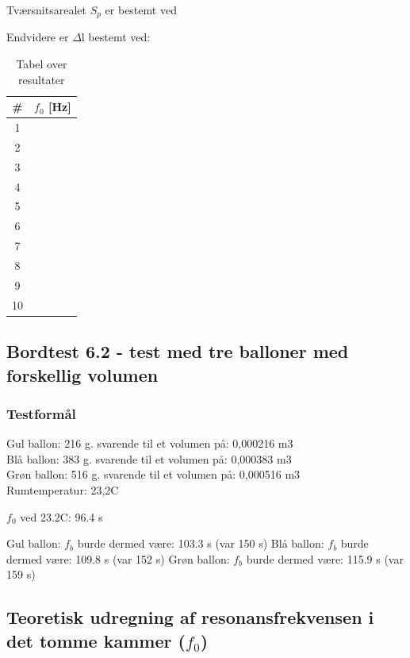 {		Tværsnitsarealet $S_{p}$ er bestemt ved
		\Sp
		
		Endvidere er $\Delta$l bestemt ved: 
		\deltal
		\Sp
	
	

	
	
			
		\begin{table}[]
\centering
\caption{Tabel over resultater}
\label{bordtest6resultater}
\begin{tabular}{c|l}
\textbf{\#}& \textbf{$f_{0}$ {[Hz]}} \\
\hline
1  &                  \\
2  &                  \\
3  &                  \\
4  &                  \\
5  &                  \\
6  &                  \\
7  &                  \\
8  &                  \\
9  &                  \\
10 &                 
\end{tabular}
\end{table}
			

\subsection{Bordtest 6.2 - test med tre balloner med forskellig volumen}

\subsubsection{Testformål}
	

Gul ballon: 216 g. svarende til et volumen på: 0,000216 m3\\ 
Blå ballon: 383 g. svarende til et volumen på: 0,000383 m3\\
Grøn ballon: 516 g. svarende til et volumen på: 0,000516 m3\\

Rumtemperatur: 23,2\degree C

		
	
$f_{0}$ ved 23.2\degree C: 96.4 s

Gul ballon: $f_{b}$ burde dermed være: 103.3 s (var 150 s) 
Blå ballon: $f_{b}$ burde dermed være: 109.8 s (var 152 s)
Grøn ballon: $f_{b}$ burde dermed være: 115.9 s (var 159 s) 		
	
	\subsection{Teoretisk udregning af resonansfrekvensen i det tomme kammer ($f_{0}$)} 

}
